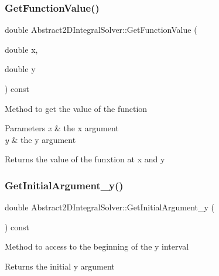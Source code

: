 \subsubsection{\texorpdfstring{Get\+Function\+Value()}{GetFunctionValue()}}
{\footnotesize\ttfamily double Abstract2\+D\+Integral\+Solver\+::\+Get\+Function\+Value (\begin{DoxyParamCaption}\item[{double}]{x,  }\item[{double}]{y }\end{DoxyParamCaption}) const\hspace{0.3cm}{\ttfamily [inline]}}

Method to get the value of the function 
\begin{DoxyParams}{Parameters}
{\em x} & the x argument \\
\hline
{\em y} & the y argument \\
\hline
\end{DoxyParams}
\begin{DoxyReturn}{Returns}
the value of the funxtion at x and y 
\end{DoxyReturn}
\mbox{\label{class_abstract2_d_integral_solver_a337907e938e5aa286618fd582b7b304e}} 
\subsubsection{\texorpdfstring{Get\+Initial\+Argument\+\_\+y()}{GetInitialArgument\_y()}}
{\footnotesize\ttfamily double Abstract2\+D\+Integral\+Solver\+::\+Get\+Initial\+Argument\+\_\+y (\begin{DoxyParamCaption}{ }\end{DoxyParamCaption}) const\hspace{0.3cm}{\ttfamily [inline]}}

Method to access to the beginning of the y interval \begin{DoxyReturn}{Returns}
the initial y argument 
\end{DoxyReturn}
\mbox{\label{class_abstract2_d_integral_solver_ad82316695f57ad589714598617c7784d}} 
